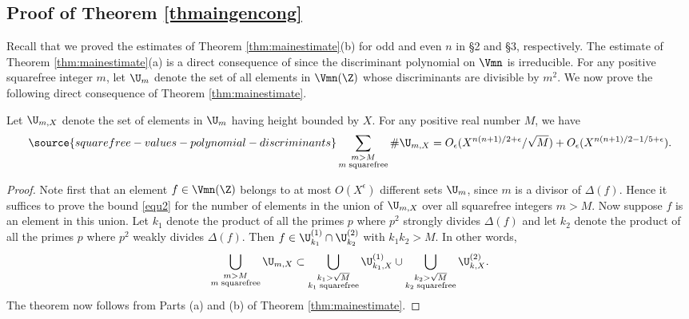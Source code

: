 \subsection{Proof of Theorem \ref{thmaingencong}}

Recall that we proved the estimates of Theorem
\ref{thm:mainestimate}(b) for odd and even $n$ in \S2 and \S3,
respectively. The estimate of Theorem \ref{thm:mainestimate}(a) is a
direct consequence of \cite[Theorem 3.5, Lemma 3.6]{geosieve} since
the discriminant polynomial on $\Vmn$ is irreducible.  For any
positive squarefree integer $m$, let $\U_m$ denote the set of all
elements in $\Vmn(\Z)$ whose discriminants are divisible by $m^2$. We
now prove the following direct consequence of Theorem \ref{thm:mainestimate}.

\begin{theorem}
\notready\label{unif}
Let $\U_{m,X}$ denote the set of elements in $\U_m$ having height
bounded by $X$. For any positive real number $M$, we have
\begin{equation}\label{equ2}
\source{squarefree-values-polynomial-discriminants}
\sum_{\substack{m>M\\ m\;\mathrm{ squarefree}}}
\#\U_{m,X}=O_\epsilon(X^{n(n+1)/2+\epsilon}/\sqrt{M})+O_\epsilon(X^{n(n+1)/2-1/5+\epsilon}).
\end{equation}
\end{theorem}
\begin{proof}
Note first that an element $f\in \Vmn(\Z)$ belongs to at most
$O(X^\epsilon)$ different sets $\U_m$, since $m$ is a divisor of
$\Delta(f)$. Hence it suffices to prove the bound \eqref{equ2} for the
number of elements in the union of $\U_{m,X}$ over all squarefree
integers $m>M$. Now suppose $f$ is an element in this union. Let $k_1$
denote the product of all the primes $p$ where $p^2$ strongly divides
$\Delta(f)$ and let $k_2$ denote the product of all the primes $p$
where $p^2$ weakly divides $\Delta(f)$. Then $f\in
\U_{k_1}^{(1)}\cap\U_{k_2}^{(2)}$ with $k_1k_2>M$. In other words,
$$\bigcup_{\substack{m>M\\ m\;\mathrm{ squarefree}}} \U_{m,X} \subset \bigcup_{\substack{k_1>\sqrt{M}\\ k_1\;\mathrm{ squarefree}}} \U_{k_1,X}^{(1)} \cup \bigcup_{\substack{k_2>\sqrt{M}\\ k_2\;\mathrm{ squarefree}}} \U_{k,X}^{(2)}.$$
The theorem now follows from Parts (a) and (b) of Theorem
\ref{thm:mainestimate}.
\end{proof}

